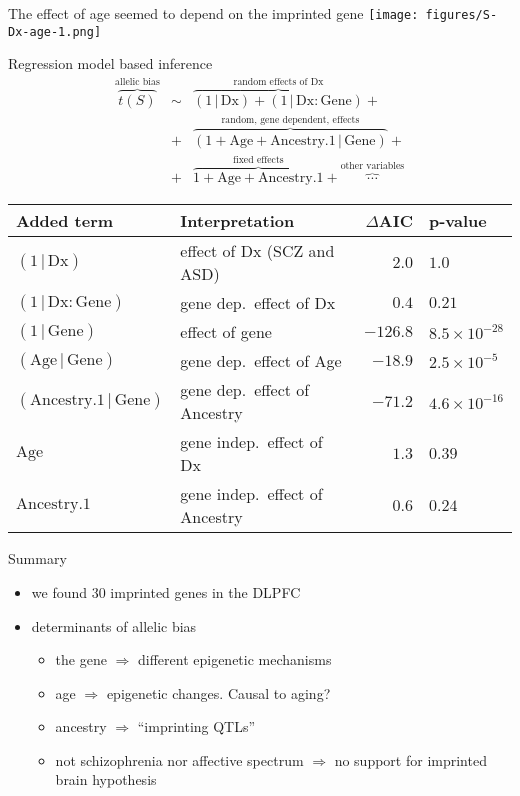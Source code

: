\documentclass[usenames,dvipsnames]{beamer}
\begin{document}
\begin{frame}{The effect of age seemed to depend on the imprinted gene}
\texttt{[image: figures/S-Dx-age-1.png]}
\end{frame}

\begin{frame}{Regression model based inference}
\footnotesize
\begin{eqnarray*}
\overbrace{t(S)}^{\text{allelic bias}} &\sim& \overbrace{(1 \,|\, \mathrm{Dx}) + (1 \,|\, \mathrm{Dx}:\mathrm{Gene})}^{\text{random effects of Dx}} + \\
&+&  \overbrace{(1 + \mathrm{Age} + \mathrm{Ancestry.1} \,|\, \mathrm{Gene})}^{\text{random, gene dependent, effects}} + \\
&+&  \overbrace{1 + \mathrm{Age} + \mathrm{Ancestry.1}}^{\text{fixed effects}}
+ \overbrace{\dotsb}^{\text{other variables}}
\end{eqnarray*}

\vfill

\begin{tabular}{|l|l|rl|}
\hline
Added term & Interpretation                             & \(\Delta\)AIC   & p-value \\
\hline
\((1\,|\,\mathrm{Dx})\) & effect of Dx (SCZ and ASD) & \(2.0\)         & \(1.0\) \\
\((1\,|\,\mathrm{Dx}:\mathrm{Gene})\) & gene dep.~effect of Dx  & \(0.4\)         & \(0.21\) \\
\hline
\((1\,|\,\mathrm{Gene})\) & effect of gene & \(-126.8\)      & \(8.5\times 10^{-28}\) \\
\((\mathrm{Age}\,|\,\mathrm{Gene})\) & gene dep.~effect of Age         & \(-18.9\)       & \(2.5\times 10^{-5}\) \\
\((\mathrm{Ancestry.1}\,|\,\mathrm{Gene})\) & gene dep.~effect of Ancestry & \(-71.2\) & \(4.6\times 10^{-16}\) \\
\hline
\(\mathrm{Age}\) & gene indep.~effect of Dx & \(1.3\) & \(0.39\) \\
\(\mathrm{Ancestry.1}\) & gene indep.~effect of Ancestry & \(0.6\) & \(0.24\) \\
\hline
\end{tabular}
\end{frame}

\begin{frame}{Summary}
\begin{itemize}
\item we found 30 imprinted genes in the DLPFC
\item determinants of allelic bias
	\begin{itemize}
		\item the gene \(\Rightarrow\) different epigenetic mechanisms
		\item age \(\Rightarrow\) epigenetic changes.  Causal to aging?
                \item ancestry \(\Rightarrow\) ``imprinting QTLs''
		\item \alert{not} schizophrenia \alert{nor} affective spectrum
			\(\Rightarrow\) no support for imprinted brain
			hypothesis
	\end{itemize}
\end{itemize}
\end{frame}
\end{document}
